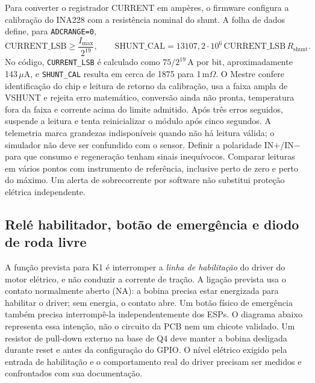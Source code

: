 Para converter o registrador CURRENT em ampères, o firmware configura a calibração do INA228 com a resistência nominal do shunt. A folha de dados define, para \texttt{ADCRANGE=0},
\begin{equation}
\mathrm{CURRENT\_LSB}\geq \frac{I_{\max}}{2^{19}},
\qquad
\mathrm{SHUNT\_CAL}=13107{,}2\cdot10^6\,
       \mathrm{CURRENT\_LSB}\,R_{\mathrm{shunt}} .
\label{eq:ina-cal}
\end{equation}
No código, \texttt{CURRENT\_LSB} é calculado como $75/2^{19}$\,A por bit, aproximadamente 143\,$\mu$A, e \texttt{SHUNT\_CAL} resulta em cerca de 1875 para 1\,m$\Omega$. O Mestre confere identificação do chip e leitura de retorno da calibração, usa a faixa ampla de VSHUNT e rejeita erro matemático, conversão ainda não pronta, temperatura fora da faixa e corrente acima do limite admitido. Após três erros seguidos, suspende a leitura e tenta reinicializar o módulo após cinco segundos. A telemetria marca grandezas indisponíveis quando não há leitura válida; o simulador não deve ser confundido com o sensor. Definir a polaridade IN+/IN$-$ para que consumo e regeneração tenham sinais inequívocos. Comparar leituras em vários pontos com instrumento de referência, inclusive perto de zero e perto do máximo. Um alerta de sobrecorrente por software não substitui proteção elétrica independente.

\subsection{Relé habilitador, botão de emergência e diodo de roda livre}
A função prevista para K1 é interromper a \emph{linha de habilitação} do driver do motor elétrico, e não conduzir a corrente de tração. A ligação prevista usa o contato normalmente aberto (NA): a bobina precisa estar energizada para habilitar o driver; sem energia, o contato abre. Um botão físico de emergência também precisa interrompê-la independentemente dos ESPs. O diagrama abaixo representa essa intenção, não o circuito da PCB nem um chicote validado. Um resistor de pull-down externo na base de Q4 deve manter a bobina desligada durante reset e antes da configuração do GPIO. O nível elétrico exigido pela entrada de habilitação e o comportamento real do driver precisam ser medidos e confrontados com sua documentação.

